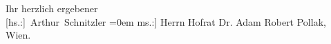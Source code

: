 \pstart
           Ihr herzlich ergebener{\\[\baselineskip]}\spacefill\mbox{{[}hs.:{]} Arthur Schnitzler}\pend
           \leftskip=0em{}
\pstart
           \noindent{}{[}ms.:{]} Herrn Hofrat Dr. Adam Robert Pollak,{\\}Wien.\pend
           \endnumbering{}  \newcommand{\dateiname}{L02498}\newcommand{\titel}{Arthur Schnitzler an Robert Adam, 10. 4. 1928}\newcommand{\editorInnen}{Martin Anton Müller und Gerd-Hermann Susen}
